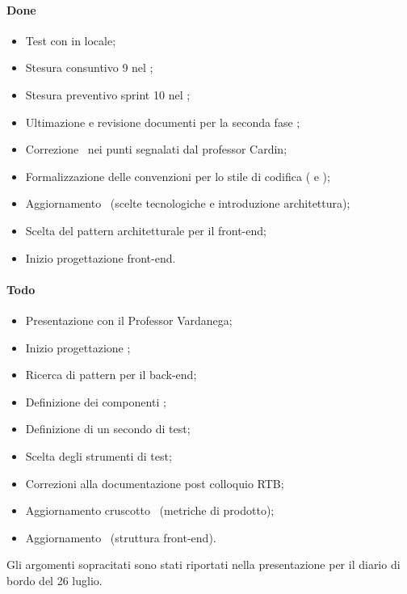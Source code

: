 \paragraph{Done}
\begin{itemize}
	\item Test con  in locale;
	\item Stesura consuntivo  9 nel \PdP;
	\item Stesura preventivo sprint 10 nel \PdP;
	\item Ultimazione e revisione documenti per la seconda fase ;
	\item Correzione \AdR\ nei punti segnalati dal professor Cardin;
	\item Formalizzazione delle convenzioni per lo stile di codifica ( e );
	\item Aggiornamento \ST\ (scelte tecnologiche e introduzione architettura);
	\item Scelta del pattern architetturale per il front-end;
	\item Inizio progettazione front-end.
\end{itemize}

\paragraph{Todo}
\begin{itemize}
	\item Presentazione  con il Professor Vardanega;
	\item Inizio progettazione ;
	\item Ricerca di pattern per il back-end;
	\item Definizione dei componenti ;
	\item Definizione di un secondo  di test;
	\item Scelta degli strumenti di test;
	\item Correzioni alla documentazione post colloquio RTB;
	\item Aggiornamento cruscotto \PdQ\ (metriche di prodotto);
	\item Aggiornamento \ST\ (struttura front-end).
\end{itemize}

\vspace{0.5\baselineskip}
\par Gli argomenti sopracitati sono stati riportati nella presentazione per il diario di bordo del 26 luglio.